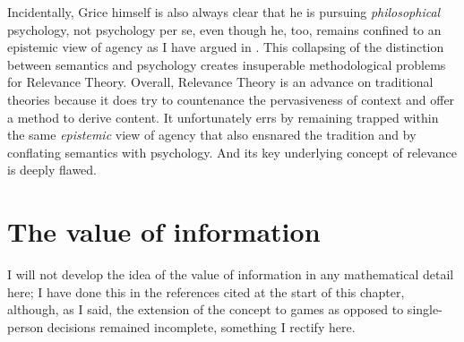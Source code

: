 Incidentally, Grice himself is also always clear that he is pursuing \emph{philosophical} psychology, not psychology per se, even though he, too, remains confined to an epistemic view of agency as I have argued in . This collapsing of the distinction between semantics and psychology creates insuperable methodological problems for Relevance Theory. Overall, Relevance Theory is an advance on traditional theories because it does try to countenance the pervasiveness of context and offer a method to derive content. It unfortunately errs by remaining trapped within the same \emph{epistemic} view of agency that also ensnared the tradition and by conflating semantics with psychology. And its key underlying concept of relevance is deeply flawed.

\section{The value of information} \label{sec:value of information}

I will not develop the idea of the value of information in any mathematical detail here; I have done this in the references cited at the start of this chapter, although, as I said, the extension of the concept to games as opposed to single-person decisions remained incomplete, something I rectify here. 


